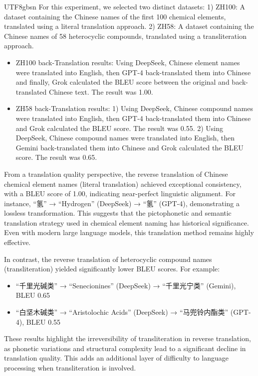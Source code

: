 \documentclass[conference]{IEEEtran}
\begin{document}
\begin{CJK*}{UTF8}{gbsn}
For this experiment, we selected two distinct datasets: 1) ZH100: A dataset containing the Chinese names of the first 100 chemical elements, translated using a literal translation approach. 2) ZH58: A dataset containing the Chinese names of 58 heterocyclic compounds, translated using a transliteration approach.

\begin{itemize}
\item ZH100 back-Translation results: Using DeepSeek, Chinese element names were translated into English, then GPT-4 back-translated them into Chinese and finally, Grok calculated the BLEU score between the original and back-translated Chinese text. The result was 1.00.
\item ZH58 back-Translation results:
1) Using DeepSeek, Chinese compound names were translated into English, then GPT-4 back-translated them into Chinese and Grok calculated the BLEU score. The result was 0.55.
2) Using DeepSeek, Chinese compound names were translated into English, then Gemini back-translated them into Chinese and Grok calculated the BLEU score. The result was 0.65.
\end{itemize}

From a translation quality perspective, the reverse translation of Chinese chemical element names (literal translation) achieved exceptional consistency, with a BLEU score of 1.00, indicating near-perfect linguistic alignment. For instance, “氢” → “Hydrogen” (DeepSeek) → “氢” (GPT-4), demonstrating a lossless transformation. This suggests that the pictophonetic and semantic translation strategy used in chemical element naming has historical significance. Even with modern large language models, this translation method remains highly effective.

In contrast, the reverse translation of heterocyclic compound names (transliteration) yielded significantly lower BLEU scores. For example:
\begin{itemize}  
\item “千里光碱类” → “Senecionines” (DeepSeek) → “千里光宁类” (Gemini), BLEU 0.65
\item “白坚木碱类” → “Aristolochic Acids” (DeepSeek) → “马兜铃内酯类” (GPT-4), BLEU 0.55
\end{itemize}

These results highlight the irreversibility of transliteration in reverse translation, as phonetic variations and structural complexity lead to a significant decline in translation quality. This adds an additional layer of difficulty to language processing when transliteration is involved.


\end{CJK*}
\end{document}
